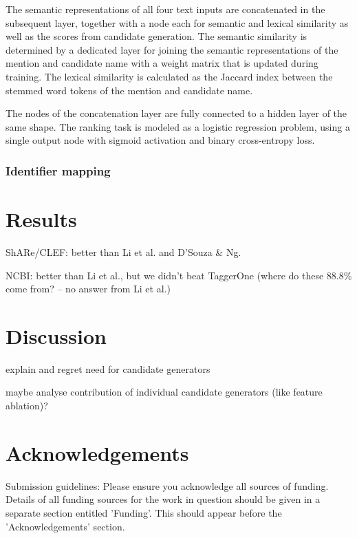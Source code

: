 \documentclass{bioinfo}
\begin{document}
The semantic representations of all four text inputs are concatenated in the subsequent layer, together with a node each for semantic and lexical similarity as well as the scores from candidate generation.
The semantic similarity is determined by a dedicated layer for joining the semantic representations of the mention and candidate name with a weight matrix that is updated during training.
The lexical similarity is calculated as the Jaccard index  %
between the stemmed word tokens \citep{porter:1980} of the mention and candidate name.

The nodes of the concatenation layer are fully connected to a hidden layer of the same shape.
The ranking task is modeled as a logistic regression problem, using a single output node with sigmoid activation and binary cross-entropy loss.

\subsubsection{Identifier mapping}
\label{ssub:id-mapping}




\section{Results}

ShARe/CLEF: better than Li et al. and D'Souza \& Ng.

NCBI: better than Li et al., but we didn't beat TaggerOne
(where do these 88.8\% come from? -- no answer from Li et al.)



\section{Discussion}

explain and regret need for candidate generators

maybe analyse contribution of individual candidate generators (like feature ablation)?



\section*{Acknowledgements}

Submission guidelines:
Please ensure you acknowledge all sources of funding.
Details of all funding sources for the work in question should be given in a separate section entitled 'Funding'. This should appear before the 'Acknowledgements' section.
\end{document}
